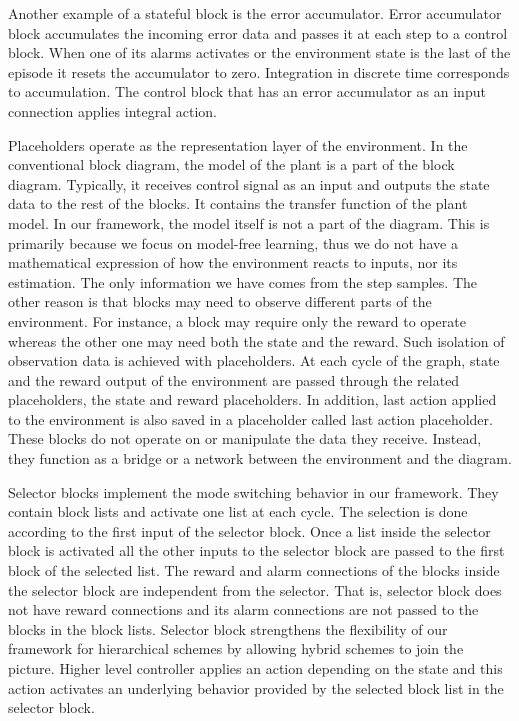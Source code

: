Another example of a stateful block is the error accumulator. Error accumulator block accumulates the incoming error data and passes it at each step to a control block. When one of its alarms activates or the environment state is the last of the episode it resets the accumulator to zero. Integration in discrete time corresponds to accumulation. The control block that has an error accumulator as an input connection applies integral action. 
  
Placeholders operate as the representation layer of the environment. In the conventional block diagram, the model of the plant is a part of the block diagram. Typically, it receives control signal as an input and outputs the state data to the rest of the blocks. It contains the transfer function of the plant model. In our framework, the model itself is not a part of the diagram. This is primarily because we focus on model-free learning, thus we do not have a mathematical expression of how the environment reacts to inputs, nor its estimation. The only information we have comes from the step samples. The other reason is that blocks may need to observe different parts of the environment. For instance, a block may require only the reward to operate whereas the other one may need both the state and the reward. Such isolation of observation data is achieved with placeholders. At each cycle of the graph, state and the reward output of the environment are passed through the related placeholders, the state and reward placeholders. In addition, last action applied to the environment is also saved in a placeholder called last action placeholder. These blocks do not operate on or manipulate the data they receive. Instead, they function as a bridge or a network between the environment and the diagram. 

Selector blocks implement the mode switching behavior in our framework. They contain block lists and activate one list at each cycle. The selection is done according to the first input of the selector block. Once a list inside the selector block is activated all the other inputs to the selector block are passed to the first block of the selected list. The reward and alarm connections of the blocks inside the selector block are independent from the selector. That is, selector block does not have reward connections and its alarm connections are not passed to the blocks in the block lists. Selector block strengthens the flexibility of our framework for hierarchical schemes by allowing hybrid schemes to join the picture. Higher level controller applies an action depending on the state and this action activates an underlying behavior provided by the selected block list in the selector block.


